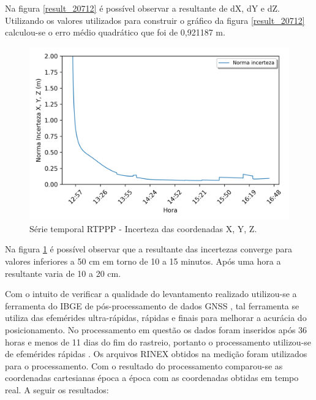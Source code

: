 Na figura \ref{result_20712} é possível observar a resultante de dX, dY e dZ. Utilizando os valores utilizados para construir o gráfico da figura \ref{result_20712} calculou-se o erro médio quadrático que foi de 0,921187 m.

\begin{figure}[H]
\centering
\includegraphics[scale=0.9]{data/Graphics/RJ_T20712/RJ_T20712_graphic_uncertainty.png}
\caption{Série temporal RTPPP - Incerteza das coordenadas X, Y, Z.}
\label{incerteza_20712}
\end{figure}

Na figura \ref{incerteza_20712} é possível observar que a resultante das incertezas converge para valores inferiores a 50 cm em torno de 10 a 15 minutos. Após uma hora a resultante varia de 10 a 20 cm.

Com o intuito de verificar a qualidade do levantamento realizado utilizou-se a ferramenta do IBGE de pós-processamento de dados GNSS \citep{ibge-ppp}, tal ferramenta se utiliza das efemérides ultra-rápidas, rápidas e finais para melhorar a acurácia do posicionamento. No processamento em questão os dados foram inseridos após 36 horas e menos de 11 dias do fim do rastreio, portanto o processamento utilizou-se de efemérides rápidas \citep{ibge_manual_ppp}. Os arquivos RINEX obtidos na medição foram utilizados para o processamento. Com o resultado do processamento comparou-se as coordenadas cartesianas época a época com as coordenadas obtidas em tempo real. A seguir os resultados:

